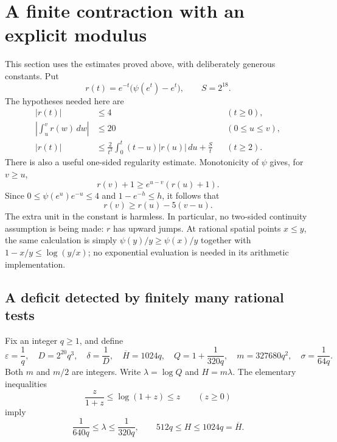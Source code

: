 \section{A finite contraction with an explicit modulus}
\label{con:section}

This section uses the estimates proved above, with deliberately generous
constants.  Put
\[
 r(t)=e^{-t}\bigl(\psi(e^t)-e^t\bigr),\qquad S=2^{18}.
\]
The hypotheses needed here are
\begin{align}
 |r(t)|&\leq 4 &&(t\geq0),\label{con:global}\\
 \left|\int_u^v r(w)\,dw\right|&\leq20
       &&(0\leq u\leq v),\label{con:signed}\\
 |r(t)|&\leq \frac{2}{t^2}\int_0^t(t-u)|r(u)|\,du+\frac{S}{t}
       &&(t\geq2).\label{con:weighted}
\end{align}
There is also a useful one-sided regularity estimate.  Monotonicity of
$\psi$ gives, for $v\geq u$,
\[
 r(v)+1\geq e^{u-v}(r(u)+1).
\]
Since $0\leq\psi(e^u)e^{-u}\leq4$ and $1-e^{-h}\leq h$, it follows that
\begin{equation}
 r(v)\geq r(u)-5(v-u).\label{con:decline}
\end{equation}
The extra unit in the constant is harmless.  In particular, no two-sided
continuity assumption is being made: $r$ has upward jumps.
At rational spatial points $x\le y$, the same calculation is simply
$\psi(y)/y\ge\psi(x)/y$ together with $1-x/y\le\log(y/x)$;
no exponential evaluation is needed in its arithmetic implementation.

\subsection{A deficit detected by finitely many rational tests}

Fix an integer $q\geq1$, and define
\begin{equation}
 \varepsilon=\frac1q,\quad D=2^{20}q^3,\quad
 \delta=\frac1D,\quad \overline H=1024q,\quad
 Q=1+\frac1{320q},\quad m=327680q^2,\quad
 \sigma=\frac1{64q}.
 \label{con:parameters}
\end{equation}
Both $m$ and $m/2$ are integers.  Write $\lambda=\log Q$ and
$H=m\lambda$.  The elementary inequalities
\[
 \frac{z}{1+z}\leq\log(1+z)\leq z\qquad(z\geq0)
\]
imply
\begin{equation}
 \frac1{640q}\leq\lambda\leq\frac1{320q},
 \qquad 512q\leq H\leq1024q=\overline H.
 \label{con:block-length}
\end{equation}

